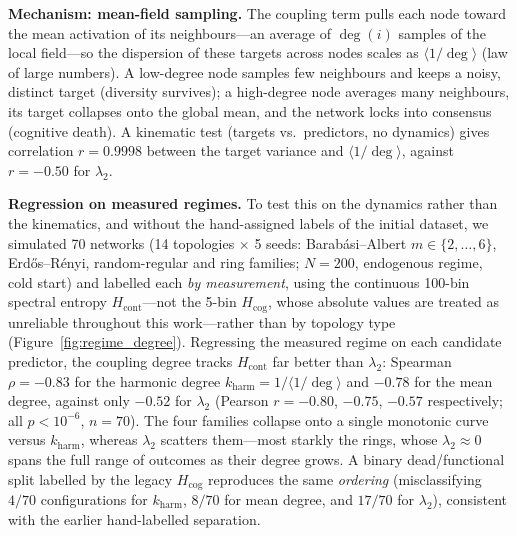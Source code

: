 ﻿\documentclass[11pt]{article}
\begin{document}
\textbf{Mechanism: mean-field sampling.} The coupling term pulls each node toward the mean activation of its neighbours---an average of $\deg(i)$ samples of the local field---so the dispersion of these targets across nodes scales as $\langle 1/\deg\rangle$ (law of large numbers). A low-degree node samples few neighbours and keeps a noisy, distinct target (diversity survives); a high-degree node averages many neighbours, its target collapses onto the global mean, and the network locks into consensus (cognitive death). A kinematic test (targets vs.\ predictors, no dynamics) gives correlation $r = 0.9998$ between the target variance and $\langle 1/\deg\rangle$, against $r = -0.50$ for $\lambda_2$.

\textbf{Regression on measured regimes.} To test this on the dynamics rather than the kinematics, and without the hand-assigned labels of the initial dataset, we simulated 70 networks (14 topologies $\times$ 5 seeds: Barab\'asi--Albert $m \in \{2,\dots,6\}$, Erd\H{o}s--R\'enyi, random-regular and ring families; $N = 200$, endogenous regime, cold start) and labelled each \emph{by measurement}, using the continuous 100-bin spectral entropy $H_{\mathrm{cont}}$---not the 5-bin $H_{\mathrm{cog}}$, whose absolute values are treated as unreliable throughout this work---rather than by topology type (Figure~\ref{fig:regime_degree}). Regressing the measured regime on each candidate predictor, the coupling degree tracks $H_{\mathrm{cont}}$ far better than $\lambda_2$: Spearman $\rho = -0.83$ for the harmonic degree $k_{\mathrm{harm}} = 1/\langle 1/\deg\rangle$ and $-0.78$ for the mean degree, against only $-0.52$ for $\lambda_2$ (Pearson $r = -0.80$, $-0.75$, $-0.57$ respectively; all $p < 10^{-6}$, $n = 70$). The four families collapse onto a single monotonic curve versus $k_{\mathrm{harm}}$, whereas $\lambda_2$ scatters them---most starkly the rings, whose $\lambda_2 \approx 0$ spans the full range of outcomes as their degree grows. A binary dead/functional split labelled by the legacy $H_{\mathrm{cog}}$ reproduces the same \emph{ordering} (misclassifying $4/70$ configurations for $k_{\mathrm{harm}}$, $8/70$ for mean degree, and $17/70$ for $\lambda_2$), consistent with the earlier hand-labelled separation.
\end{document}
